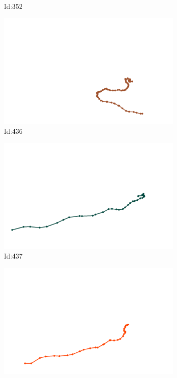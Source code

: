 \documentclass[12pt,twoside]{report}
\begin{document}
\begin{figure}
\begin{subfigure}[b]{0.20\textwidth}
\caption{Id:352}
\end{subfigure}
\begin{subfigure}[b]{0.20\textwidth}
\centering
\includegraphics[width=\textwidth]{../../trajectories/436.png}
\caption{Id:436}
\end{subfigure}
\begin{subfigure}[b]{0.20\textwidth}
\centering
\includegraphics[width=\textwidth]{../../trajectories/437.png}
\caption{Id:437}
\end{subfigure}
\begin{subfigure}[b]{0.20\textwidth}
\centering
\includegraphics[width=\textwidth]{../../trajectories/468.png}

\end{subfigure}
\end{figure}
\end{document}
